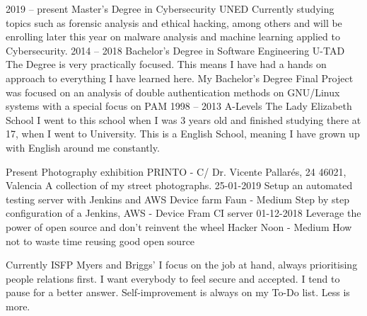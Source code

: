 \documentclass[9pt]{developercv} %
\begin{document}


\begin{entrylist}
	\entry
	  {2019 -- present}
	  {Master's Degree in Cybersecurity}
    {UNED}
    {Currently studying topics such as forensic analysis and ethical hacking, among others and will be enrolling later this year on malware analysis and machine learning applied to Cybersecurity.}
	\entry
		{2014 -- 2018}
		{Bachelor's Degree in Software Engineering}
		{U-TAD}
		{The Degree is very practically focused. This means I have had a hands on approach to everything I have learned here.
		My Bachelor's Degree Final Project was focused on an analysis of double authentication methods on GNU/Linux systems with a special focus on PAM}
	\entry
		{1998 -- 2013}
		{A-Levels}
		{The Lady Elizabeth School}
		{I went to this school when I was 3 years old and finished studying there at 17, when I went to University. This is a English School, meaning I have grown up with English around me constantly.}
\end{entrylist}


\begin{entrylist}
	\entry
	  {Present}
    {Photography exhibition}
    {PRINTO - C/ Dr. Vicente Pallarés, 24 46021, Valencia}
    {A collection of my street photographs.}
  \entry
		{25-01-2019}
		{Setup an automated testing server with Jenkins and AWS Device farm}
		{Faun - Medium}
		{Step by step configuration of a Jenkins, AWS - Device Fram CI server}
	\entry
		{01-12-2018}
		{Leverage the power of open source and don’t reinvent the wheel}
		{Hacker Noon - Medium}
    {How not to waste time reusing good open source}
\end{entrylist}
\newpage


\begin{entrylist}
	\entry
		{Currently}
		{ISFP}
		{Myers and Briggs'}
		{I focus on the job at hand, always prioritising people relations first.
		I want everybody to feel secure and accepted.
		I tend to pause for a better answer.
		Self-improvement is always on my To-Do list.
		Less is more.}
\end{entrylist}
\end{document}
